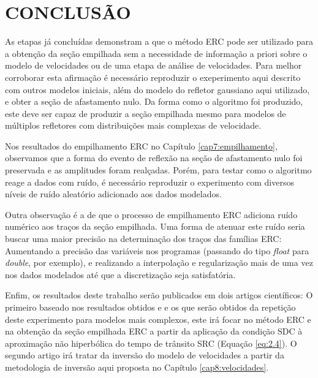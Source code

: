 \chapter{CONCLUSÃO}
\label{cap10:conclusao}

As etapas já concluídas demonstram a que o método ERC pode ser utilizado para a obtenção da seção empilhada sem a necessidade
de informação a priori sobre o modelo de velocidades ou de uma etapa de análise de velocidades. Para melhor corroborar esta 
afirmação é necessário reproduzir o exeperimento aqui descrito com outros modelos iniciais, além do modelo do refletor gaussiano
aqui utilizado, e obter a seção de afastamento nulo.
Da forma como o algoritmo foi produzido, este deve ser capaz de produzir a seção empilhada mesmo para modelos de múltiplos refletores
com distribuições mais complexas de velocidade.

Nos resultados do empilhamento ERC no Capítulo \ref{cap7:empilhamento}, observamos que a forma do evento de reflexão na seção
de afastamento nulo foi preservada e as amplitudes foram realçadas. Porém, para testar como o algoritmo reage
a dados com ruído, é necessário reproduzir o experimento com diversos níveis de ruído aleatório adicionado aos dados modelados.

Outra observação é a de que o processo de empilhamento ERC adiciona ruído numérico aos traços da seção empilhada. Uma forma de
atenuar este ruído seria buscar uma maior precisão na determinação dos traços das famílias ERC: Aumentando a precisão das variáveis
nos programas (passando do tipo \textit{float} para \textit{double}, por exemplo), e realizando a interpolação e regularização
mais de uma vez nos dados modelados até que a discretização seja satisfatória.

Enfim, os resultados deste trabalho serão publicados em dois artigos científicos: O primeiro baseado 
nos resultados obtidos e e os que 
serão obtidos da repetição deste experimento para modelos mais complexos, este irá focar no método ERC e na obtenção da seção
empilhada ERC a partir da aplicação da condição SDC à aproximação não hiperbólica do tempo de trânsito SRC (Equação \ref{eq:2.4}).
O segundo artigo irá tratar da inversão do modelo de velocidades a partir da metodologia de inversão aqui proposta
no Capítulo \ref{cap8:velocidades}.

